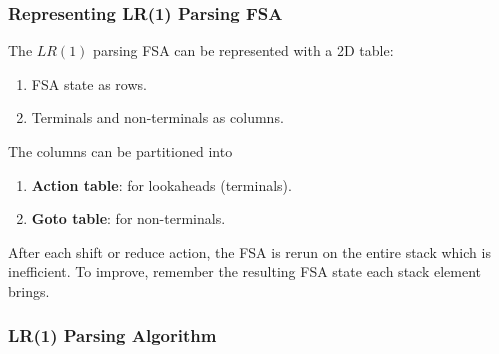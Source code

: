 \subsubsection{Representing LR(1) Parsing FSA}

\begin{definition}
    The $LR(1)$ parsing FSA can be represented with a 2D table:
    \begin{enumerate}
        \item FSA state as rows.
        \item Terminals and non-terminals as columns.
    \end{enumerate}
    
    The columns can be partitioned into
    \begin{enumerate}
        \item \textbf{Action table}: for lookaheads (terminals).
        \item \textbf{Goto table}: for non-terminals.
    \end{enumerate}
\end{definition}

\begin{remark}
    After each shift or reduce action, the FSA is rerun on the entire stack which is inefficient. To improve, remember the resulting FSA state each stack element brings.
\end{remark}

\subsubsection{LR(1) Parsing Algorithm}

